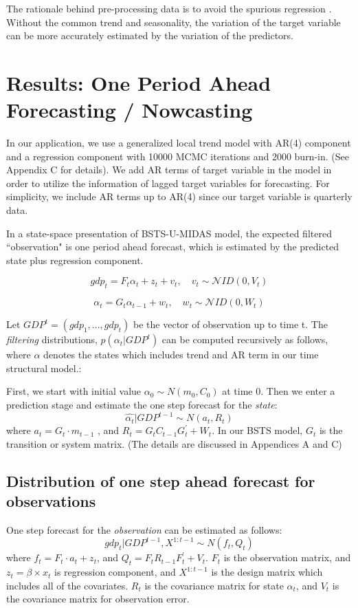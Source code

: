 The rationale behind pre-processing data is to avoid the spurious regression \cite{Scott2014a}. Without the common trend and seasonality, the variation of the target variable can be more accurately estimated by the variation of the predictors.  

\section{Results: One Period Ahead Forecasting / Nowcasting}


In our application, we use a generalized local trend model with AR(4) component and a regression component with 10000 MCMC iterations  and 2000 burn-in. (See Appendix C for details). We add AR terms of target variable in the model in order to utilize the information of lagged target variables for forecasting. For simplicity, we include AR terms up to AR(4) since our target variable is quarterly data. 

In a state-space presentation of BSTS-U-MIDAS model, the expected filtered ``observation" is one period ahead forecast, which is estimated by the predicted state plus regression component. 

$$gdp_{t} = F_{t}\alpha_{t}+ z_{t} +v_{t},\quad  v_{t}\sim \mathcal NID(0,V_{t})$$


$$\alpha_{t} = G_{t}\alpha_{t-1}+w_{t},\quad  w_{t}\sim \mathcal NID(0,W_{t})$$

Let $ GDP^t = (gdp_1, ..., gdp_t) $ be the vector of observation up to time t. The \textit{filtering} distributions, $p(\alpha_t|GDP^{t}) $ can be computed recursively as follows, where $\alpha$ denotes the states which includes trend and AR term in our time structural model.:

First, we start with initial value $ \alpha_0 \sim N(m_0, C_0) $ at time $0$. Then we enter a prediction stage and  estimate the one step forecast for the \textit{state}: 
$$\hat{\alpha_t}|GDP^{t-1} \sim N(a_t, R_t) $$
where $a_t = G_t \cdot m_{t-1}$ , and $R_t = G_t C_{t-1} G_t^\prime + W_t$. In our BSTS model,  $G_t$ is the transition or system matrix. (The details are discussed in Appendices A and C)  



\subsection{Distribution of one step ahead forecast for observations}

One step forecast for the \textit{observation} can be estimated as follows: 
$$ gdp_t|GDP^{t-1}, X^{1:t-1}  \sim N(f_t, Q_t) $$
where $f_t = F_t \cdot a_t  + z_{t}$, and $Q_t = F_t R_{t-1} F_t^\prime + V_t$. $F_t$ is the observation matrix, and $z_{t} = \beta \times  x_{t}$ is regression component, and  $X^{1:t-1}$ is the design matrix which includes all of the covariates. $R_{t}$ is the covariance matrix for state $\alpha_{t}$, and $V_t$ is the covariance matrix for observation error.


